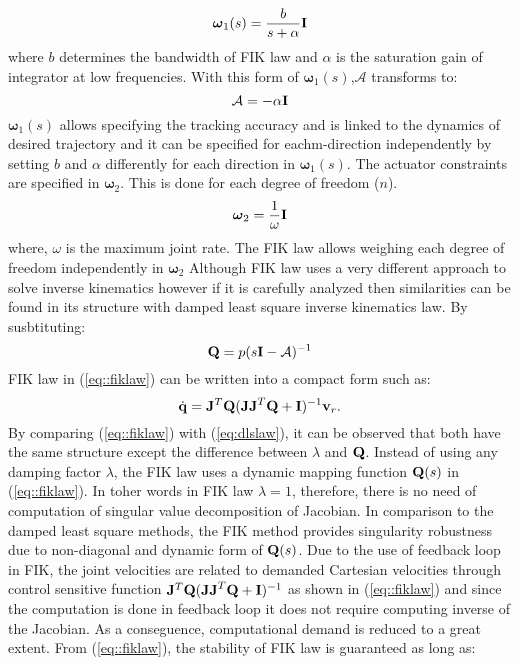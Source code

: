 %
\begin{equation}
{\boldsymbol \omega}_1(s) = \frac{b}{s+\alpha}{\bf I}%
\end{equation}
%
where $b$ determines the bandwidth of FIK law and $\alpha$ is the saturation gain of integrator at low frequencies. With this form of ${\boldsymbol \omega}_1(s)$,${\mathcal A}$ transforms to:
%
\begin{equation}
{\mathcal A} = -\alpha {\bf I}%
\end{equation}
%
${\boldsymbol \omega}_1(s)$ allows specifying the tracking accuracy and is linked to the dynamics of desired trajectory and it can be specified for eachm-direction independently by setting $b$ and $\alpha$ differently for each direction in ${\boldsymbol \omega}_1(s)$. The actuator constraints are specified in ${\boldsymbol \omega}_2$. This is done for each degree of freedom ($n$).
%
\begin{equation}
{\boldsymbol \omega}_2 = \frac{1}{\omega}{\bf I}%
\end{equation}
%
where, $\omega$ is the maximum joint rate. The FIK law allows weighing each degree of freedom independently in ${\boldsymbol \omega}_2$
%
Although FIK law uses a very different approach to solve inverse kinematics however if it is carefully analyzed then similarities can be found in its structure with damped least square inverse kinematics law. By susbtituting:
%
\begin{equation}
{\bf Q} = p(s{\bf I} - {\mathcal A})^{-1}
\end{equation}
%
FIK law in (\ref{eq::fiklaw}) can be written into a compact form such as:
%
\begin{equation}
\dot{\bf q} = {\bf J}^T{\bf Q}({\bf JJ}^T{\bf Q} + {\bf I})^{-1}{\bf v}_r.
\end{equation}
%
By comparing (\ref{eq::fiklaw}) with (\ref{eq:dlslaw}), it can be observed that both have the same structure except the difference between $\lambda$ and ${\bf Q}$. Instead of using any damping factor $\lambda$, the FIK law uses a dynamic mapping function ${\bf Q}(s)$ in (\ref{eq::fiklaw}). In toher words in FIK law $\lambda = 1$, therefore, there is no need of computation of singular value decomposition of Jacobian. In comparison to the damped least square methods, the FIK method provides singularity robustness due to non-diagonal and dynamic form of ${\bf Q}(s)$.
%
Due to the use of feedback loop in FIK, the joint velocities are related to demanded Cartesian velocities through control sensitive function ${\bf J}^T{\bf Q}({\bf JJ}^T{\bf Q} + {\bf I})^{-1}$ as shown in (\ref{eq::fiklaw}) and since the computation is done in feedback loop it does not require computing inverse of the Jacobian. As a conseguence, computational demand is reduced to a great extent. From (\ref{eq::fiklaw}), the stability of FIK law is guaranteed as long as:

